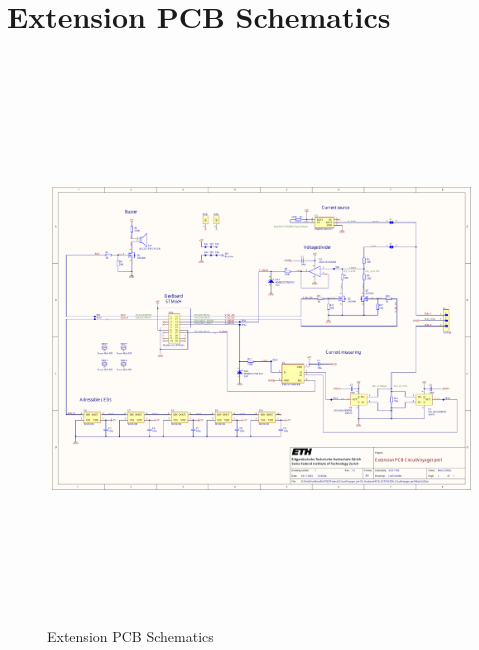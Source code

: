 \newpage



\section{Extension PCB Schematics}
\label{sec:Extension PCB Schematics}
\begin{figure}[H]
	\centering
	\includegraphics[height=15cm, angle=270]{../../../5_Hardware/PCB_EXTENSION_CircuitVoyager_pre1/Project Outputs for PCB_EXT_CV_PRE1/Schematic_PCB_EXTENSION_CircuitVoyager_pre1.pdf}
	\caption{Extension PCB Schematics}
	\label{fig:Extension PCB Schematics}
\end{figure}
\newpage